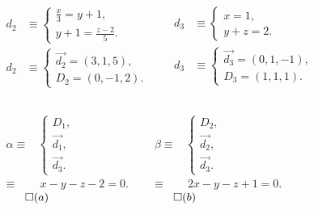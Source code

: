 \documentclass[10pt]{beamer}
\newcommand{\vect}[1] {
  \overrightarrow{#1}}
\begin{document}
{\begin{columns}[c]
		\centering			       
		 \begin{align*}
	        d_2 &\equiv \begin{cases} 
		      \frac{x}{3}=y+1, \\
		      y+1=\frac{z-2}{5}.
			    \end{cases} \\ 			    
	        d_2 &\equiv \begin{cases}
		            \vect{d_2} = (3,1,5), \\
		            D_2 = (0,-1,2).
		            \end{cases}      
		\end{align*}
	
		\centering
		\begin{align*}
	        d_3 &\equiv \begin{cases} 
		      x=1, \\
		      y+z=2.
			    \end{cases} \\ 			    
	        d_3 &\equiv \begin{cases}
		            \vect{d_3} = (0,1,-1), \\
		            D_3 = (1,1,1).
		            \end{cases}      
		\end{align*}
		\end{columns}
		\bigskip
		\begin{columns}[c]

		\begin{align*}
		\alpha \equiv& \begin{cases}
		                D_1, \\
		                \vect{d_1}, \\
		                \vect{d_3}.
		               \end{cases} \\
		       \equiv&\ x-y-z-2=0.
		\end{align*} \hfill $\qed(a)$
		
		\begin{align*}
		\beta \equiv& \begin{cases}
		                D_2, \\
		                \vect{d_2}, \\
		                \vect{d_3}.
		               \end{cases} \\
		       \equiv&\ 2x-y-z+1=0.
		\end{align*} \hfill $\qed(b)$
		

\end{columns}}
\end{document}
